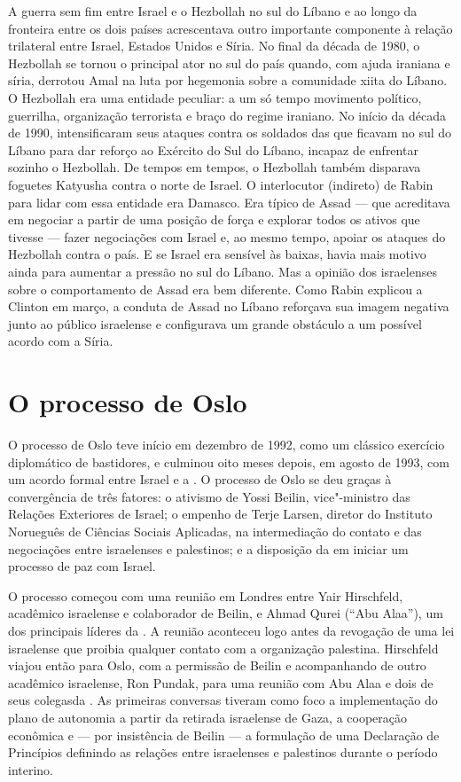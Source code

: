A guerra sem fim entre Israel e o Hezbollah no sul do Líbano e ao longo
da fronteira entre os dois países acrescentava outro importante
componente à relação trilateral entre Israel, Estados Unidos e Síria. No
final da década de 1980, o Hezbollah se tornou o principal ator no sul
do país quando, com ajuda iraniana e síria, derrotou Amal na luta por
hegemonia sobre a comunidade xiita do Líbano. O Hezbollah era uma
entidade peculiar: a um só tempo movimento político, guerrilha,
organização terrorista e braço do regime iraniano. No início da década
de 1990, intensificaram seus ataques contra os soldados das  que
ficavam no sul do Líbano para dar reforço ao Exército do Sul do Líbano,
incapaz de enfrentar sozinho o Hezbollah. De tempos em tempos, o
Hezbollah também disparava foguetes Katyusha contra o norte de Israel. O
interlocutor (indireto) de Rabin para lidar com essa entidade era Damasco.
Era típico de Assad --- que acreditava em negociar a partir de uma posição
de força e explorar todos os ativos que tivesse --- fazer negociações com
Israel e, ao mesmo tempo, apoiar os ataques do Hezbollah contra o país. E
se Israel era sensível às baixas, havia mais motivo ainda para aumentar
a pressão no sul do Líbano. Mas a opinião dos israelenses sobre o
comportamento de Assad era bem diferente. Como Rabin explicou a Clinton
em março, a conduta de Assad no Líbano reforçava sua imagem negativa
junto ao público israelense e configurava um grande obstáculo a um
possível acordo com a Síria.

\section{O processo de Oslo}

O processo de Oslo teve início em dezembro de 1992, como um clássico
exercício diplomático de bastidores, e culminou oito meses depois, em
agosto de 1993, com um acordo formal entre Israel e a . O processo de
Oslo se deu graças à convergência de três fatores: o ativismo de Yossi
Beilin, vice"-ministro das Relações Exteriores de Israel; o empenho de
Terje Larsen, diretor do Instituto Norueguês de Ciências Sociais
Aplicadas, na intermediação do contato e das negociações entre
israelenses e palestinos; e a disposição da  em iniciar um processo
de paz com Israel.

O processo começou com uma reunião em Londres entre Yair Hirschfeld,
acadêmico israelense e colaborador de Beilin, e Ahmad Qurei (``Abu
Alaa''), um dos principais líderes da . A reunião aconteceu logo antes
da revogação de uma lei israelense que proibia qualquer contato com a
organização palestina. Hirschfeld viajou então para Oslo, com a
permissão de Beilin e acompanhando de outro acadêmico israelense, Ron
Pundak, para uma reunião com Abu Alaa e dois de seus colegasda . As
primeiras conversas tiveram como foco a implementação do plano de
autonomia a partir da retirada israelense de Gaza, a cooperação
econômica e --- por insistência de Beilin --- a formulação de uma
Declaração de Princípios definindo as relações entre israelenses e
palestinos durante o período interino.


